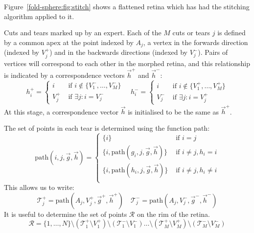 \documentclass{article}
\begin{document}
Figure~\ref{fold-sphere:fig:stitch} shows a flattened
retina which has had the stitching algorithm applied to it. 

Cuts and tears marked up by an expert.  Each of the $M$ cuts or tears
$j$ is defined by a common apex at the point indexed by $A_j$, a
vertex in the forwards direction (indexed by $V^+_j$) and in the
backwards directions (indexed by $V^-_j$).  Pairs of vertices will
correspond to each other in the morphed retina, and this relationship
is indicated by a correspondence vectors $\vec{h}^+$ and $\vec{h}^-$:
\begin{displaymath}
  h^+_i =  \left\{
    \begin{array}{ll}
      i & \mbox{ if } i \not\in \{V^-_1,\dots, V^-_M\} \\
      V^+_j  & \mbox{ if } \exists j: i = V^-_j
    \end{array}\right.
  \quad
  h^-_i =  \left\{
    \begin{array}{ll}
      i & \mbox{ if } i \not\in \{V^+_1,\dots, V^+_M\} \\
      V^-_j  & \mbox{ if } \exists j: i = V^+_j
    \end{array}\right.
\end{displaymath}
At this stage, a correspondence vector $\vec{h}$ is initialised to be
the same as $\vec{h}^+$.

The set of points in each tear is determined using the function
$\mathrm{path}$:
\begin{displaymath}
  \mathrm{path}(i, j, \vec{g}, \vec{h})  = \left\{ 
  \begin{array}{ll}
    \{i\} & \mbox{ if } i = j \\
      \{i, \mathrm{path}(g_i, j, \vec{g}, \vec{h})\} & \mbox{ if } i \ne j, h_i=i \\
      \{i, \mathrm{path}(h_i, j, \vec{g}, \vec{h})\}    & \mbox{ if } i \ne j, h_i\ne i \\
    \end{array}\right.
\end{displaymath}
This allows us to write:
\begin{displaymath}
  \mathcal{T}^+_j  = \mathrm{path}(A_j, V_j^+, \vec{g}^+, \vec{h}^+) \quad 
  \mathcal{T}^-_j  = \mathrm{path}(A_j, V_j^-, \vec{g}^-, \vec{h}^-)
\end{displaymath}
It is useful to determine the set of points $\mathcal{R}$ on the rim
of the retina.
\begin{displaymath}
  \mathcal{R} = \{1,\dots,N\} 
  \setminus (\mathcal{T}^+_1 \setminus V^+_1) 
  \setminus (\mathcal{T}^-_1 \setminus V^-_1)  
  \dots 
  \setminus (\mathcal{T}^+_M \setminus V^+_M)
  \setminus (\mathcal{T}^-_M \setminus V^-_M)
\end{displaymath}
\end{document}
